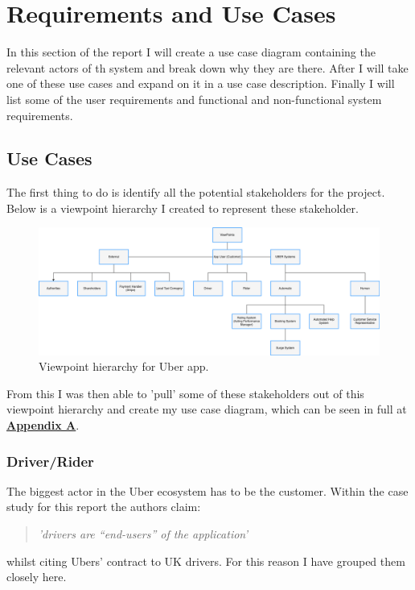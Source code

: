\documentclass{article}
\begin{document}
    \section{Requirements and Use Cases}
    In this section of the report I will create a use case diagram containing the relevant actors of th system and break down why they are there. After I will
    take one of these use cases and expand on it in a use case description. Finally I will list some of the user requirements and functional and non-functional system
    requirements.

    \subsection{Use Cases}
    The first thing to do is identify all the potential stakeholders for the project. Below is a viewpoint hierarchy I created to represent these stakeholder.
    \begin{figure}[H]
      \centering
      \includegraphics[width=12cm]{assets/viewpoints.drawio.png}
      \caption{Viewpoint hierarchy for Uber app.}
      \label{fig:viewpoints}
    \end{figure}

    From this I was then able to 'pull' some of these stakeholders out of this viewpoint hierarchy and create my use case diagram, which can be seen in full at \hyperref[sec:AppendixA]{\textbf{Appendix A}}.
    
    \newpage
    \subsubsection{Driver/Rider}
    The biggest actor in the Uber ecosystem has to be the customer. Within the case study for this report the authors claim:
    \begin{quote}
      \textit{'drivers are “end-users” of the application'}
    \end{quote}
    whilst citing Ubers' contract to UK drivers. For this reason I have grouped them closely here.
\end{document}
